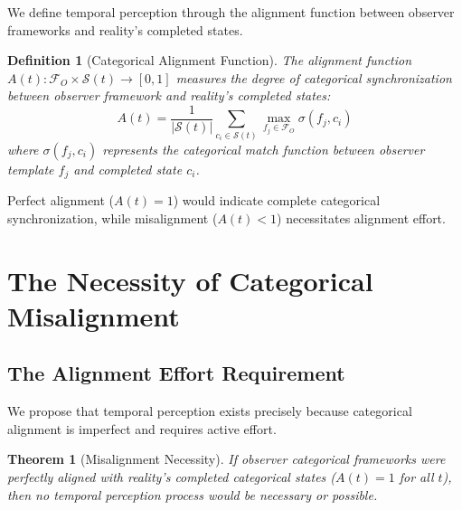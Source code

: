 \documentclass[12pt,a4paper]{article}
\newtheorem{theorem}{Theorem}
\newtheorem{definition}{Definition}
\begin{document}
We define temporal perception through the alignment function between observer frameworks and reality's completed states.

\begin{definition}[Categorical Alignment Function]
The alignment function $A(t): \mathcal{F}_O \times \mathcal{S}(t) \rightarrow [0,1]$ measures the degree of categorical synchronization between observer framework and reality's completed states:
$$A(t) = \frac{1}{|\mathcal{S}(t)|} \sum_{c_i \in \mathcal{S}(t)} \max_{f_j \in \mathcal{F}_O} \sigma(f_j, c_i)$$
where $\sigma(f_j, c_i)$ represents the categorical match function between observer template $f_j$ and completed state $c_i$.
\end{definition}

Perfect alignment ($A(t) = 1$) would indicate complete categorical synchronization, while misalignment ($A(t) < 1$) necessitates alignment effort.

\section{The Necessity of Categorical Misalignment}

\subsection{The Alignment Effort Requirement}

We propose that temporal perception exists precisely because categorical alignment is imperfect and requires active effort.

\begin{theorem}[Misalignment Necessity]
If observer categorical frameworks were perfectly aligned with reality's completed categorical states ($A(t) = 1$ for all $t$), then no temporal perception process would be necessary or possible.
\end{theorem}
\end{document}
